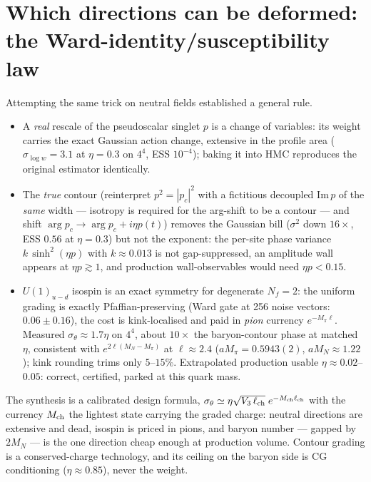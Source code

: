 \documentclass[11pt]{article}
\begin{document}
\section{Which directions can be deformed: the Ward-identity/susceptibility law}
Attempting the same trick on neutral fields established a general rule.
\begin{itemize}
\item A \emph{real} rescale of the pseudoscalar singlet $p$ is a change of variables: its weight
  carries the exact Gaussian action change, extensive in the profile area
  ($\sigma_{\log w}=3.1$ at $\eta=0.3$ on $4^4$, ESS $10^{-4}$); baking it into HMC reproduces
  the original estimator identically.
\item The \emph{true} contour (reinterpret $p^2=|p_c|^2$ with a fictitious decoupled
  $\mathrm{Im}\,p$ of the \emph{same} width --- isotropy is required for the arg-shift to be a
  contour --- and shift $\arg p_c\to\arg p_c+i\eta p(t)$) removes the Gaussian bill
  ($\sigma^2$ down $16\times$, ESS $0.56$ at $\eta=0.3$) but not the exponent: the per-site phase
  variance $k\,\sinh^2(\eta p)$ with $k\approx0.013$ is not gap-suppressed, an amplitude wall
  appears at $\eta p\gtrsim1$, and production wall-observables would need $\eta p<0.15$.
\item $U(1)_{u-d}$ isospin is an exact symmetry for degenerate $N_f=2$: the uniform grading is
  exactly Pfaffian-preserving (Ward gate at 256 noise vectors: $0.06\pm0.16$), the cost is
  kink-localised and paid in \emph{pion} currency $e^{-M_\pi\ell}$.  Measured
  $\sigma_\theta\approx1.7\eta$ on $4^4$, about $10\times$ the baryon-contour phase at matched
  $\eta$, consistent with $e^{2\ell(M_N-M_\pi)}$ at $\ell\approx2.4$ ($aM_\pi=0.5943(2)$,
  $aM_N\approx1.22$); kink rounding trims only $5$--$15\%$.  Extrapolated production usable
  $\eta\approx0.02$--$0.05$: correct, certified, parked at this quark mass.
\end{itemize}
The synthesis is a calibrated design formula,
$\sigma_\theta\simeq\eta\sqrt{V_3\,\ell_{\rm ch}}\;e^{-M_{\rm ch}\ell_{\rm ch}}$ with the currency
$M_{\rm ch}$ the lightest state carrying the graded charge: neutral directions are extensive
and dead, isospin is priced in pions, and baryon number --- gapped by $2M_N$ --- is the one
direction cheap enough at production volume.  Contour grading is a conserved-charge technology,
and its ceiling on the baryon side is CG conditioning ($\eta\approx0.85$), never the weight.
\end{document}
